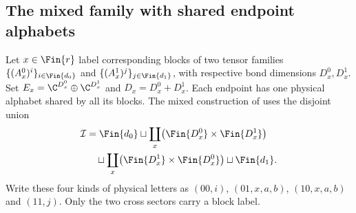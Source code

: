 
\subsection{The mixed family with shared endpoint alphabets}
\label{sec:mpo_joint_mixed_family}

Let $x\in\Fin{r}$ label corresponding blocks of two tensor families
$\{(A_x^0)^i\}_{i\in\Fin{d_0}}$ and
$\{(A_x^1)^j\}_{j\in\Fin{d_1}}$, with respective bond dimensions
$D_x^0,D_x^1$. Set $E_x=\C^{D_x^0}\oplus\C^{D_x^1}$ and
$D_x=D_x^0+D_x^1$. Each endpoint has one physical alphabet shared by all
its blocks. The mixed construction of
\cite[Section~5]{GarreRubio2023MPOSym} uses the disjoint union
\begin{align}
    \mathcal I
     & =\Fin{d_0}
    \sqcup\coprod_x\bigl(\Fin{D_x^0}\times\Fin{D_x^1}\bigr)
    \label{eq:mpo_joint_mixed_alphabet}                             \\
     & \quad\sqcup\coprod_x\bigl(\Fin{D_x^1}\times\Fin{D_x^0}\bigr)
    \sqcup\Fin{d_1}.
    \notag
\end{align}
Write these four kinds of physical letters as $(00,i)$, $(01,x,a,b)$,
$(10,x,a,b)$ and $(11,j)$. Only the two cross sectors carry a block label.


